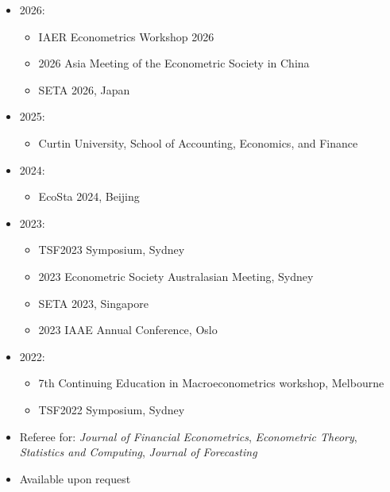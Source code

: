 \documentclass[letterpaper,10pt]{article}
\begin{document}
\begin{itemize}
\item 2026:
\begin{itemize}
\item  IAER Econometrics Workshop 2026
      \item 2026 Asia Meeting of the Econometric Society in China
      \item SETA 2026, Japan
    \end{itemize}
  \item 2025:
    \begin{itemize}
      \item Curtin University, School of Accounting, Economics, and Finance 
    \end{itemize}
  \item 2024:
    \begin{itemize}
      \item EcoSta 2024, Beijing
    \end{itemize}
  \item 2023:
    \begin{itemize}
      \item TSF2023 Symposium, Sydney
      \item 2023 Econometric Society Australasian Meeting, Sydney
      \item SETA 2023, Singapore
      \item 2023 IAAE Annual Conference, Oslo
    \end{itemize}
  \item 2022:
    \begin{itemize}
      \item 7th Continuing Education in Macroeconometrics workshop, Melbourne
      \item TSF2022 Symposium, Sydney
    \end{itemize}
\end{itemize}


\begin{itemize}
  \item Referee for: \textit{Journal of Financial Econometrics}, \textit{Econometric Theory}, \textit{Statistics and Computing}, \textit{Journal of Forecasting}
\end{itemize}


\begin{itemize}
  \item Available upon request
\end{itemize}
\end{document}
